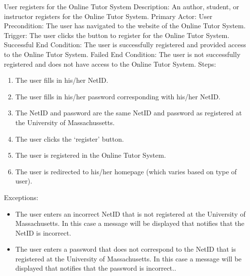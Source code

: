 	

	
	
    \begin{section}{User registers for the Online Tutor System}
		Description: An author, student, or instructor registers for the Online Tutor System. \newline
		Primary Actor: User \newline
		Precondition: The user has navigated to the website of the Online Tutor System. \newline
		Trigger: The user clicks the button to register for the Online Tutor System. \newline
		Successful End Condition: The user is successfully registered and provided access to the Online Tutor System. \newline
		Failed End Condition: The user is not successfully registered and does not have access to the Online Tutor System. \newline
		\newline
        Steps:
        \begin{enumerate}
            \item{The user fills in his/her NetID.}
            \item{The user fills in his/her password corresponding with his/her NetID.}
            \item{The NetID and password are the same NetID and password as registered at the University of Massachussetts.}
			\item{The user clicks the ‘register’ button.}
			\item{The user is registered in the Online Tutor System.}
			\item{The user is redirected to his/her homepage (which varies based on type of user).}
        \end{enumerate}
        Exceptions:
        \begin{itemize}
            \item{The user enters an incorrect NetID that is not registered at the University of Massachusetts. In this case a message will be displayed that notifies that the NetID is incorrect.}
			\item{The user enters a password that does not correspond to the NetID that is registered at the University of Massachusetts. In this case a message will be displayed that notifies that the password is incorrect..}
        \end{itemize}
    \end{section}		
	
